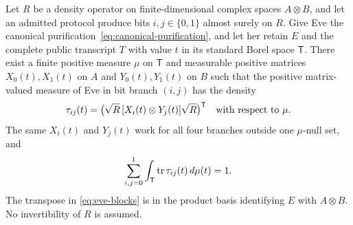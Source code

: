 \begin{lemma}
\label{lem:transcript}
Let $R$ be a density operator on finite-dimensional complex spaces
$A\otimes B$, and let an admitted protocol produce bits
$i,j\in\{0,1\}$ almost surely on $R$.  Give Eve the canonical
purification~\eqref{eq:canonical-purification},
and let her retain $E$ and the complete public transcript $T$ with value
$t$ in its standard Borel space $\mathsf T$.  There exist a finite
positive measure $\mu$ on $\mathsf T$ and measurable positive matrices
$X_0(t),X_1(t)$ on $A$ and $Y_0(t),Y_1(t)$ on $B$ such that the positive
matrix-valued measure of Eve in bit branch $(i,j)$ has the density
\begin{equation}\label{eq:eve-blocks}
 \tau_{ij}(t)=
 \bigl(\sqrt R\,[X_i(t)\otimes Y_j(t)]\sqrt R\bigr)^\mathsf T
 \quad\text{with respect to }\mu.
\end{equation}
The same $X_i(t)$ and $Y_j(t)$ work for all four branches outside one
$\mu$-null set, and
\[
 \sum_{i,j=0}^1\int_{\mathsf T}\operatorname{tr}\tau_{ij}(t)\,d\mu(t)=1.
\]
The transpose in \eqref{eq:eve-blocks} is in the product basis
identifying $E$ with $A\otimes B$.  No invertibility of $R$ is assumed.
\end{lemma}

